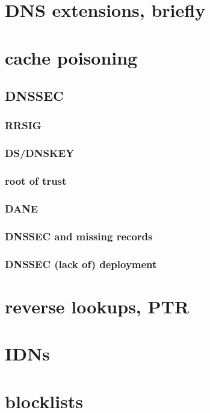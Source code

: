 

\section{DNS extensions, briefly}


\section{cache poisoning}




\subsection{DNSSEC}


\subsubsection{RRSIG}


\subsubsection{DS/DNSKEY}


\subsubsection{root of trust}


\subsubsection{DANE}


\subsubsection{DNSSEC and missing records}


\subsubsection{DNSSEC (lack of) deployment}


\section{reverse lookups, PTR}


\section{IDNs}


\section{blocklists}


